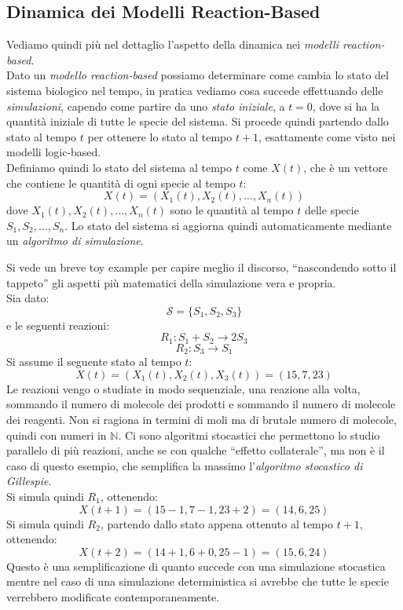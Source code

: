 \documentclass[a4paper,12pt, oneside]{book}
\begin{document}
\subsection{Dinamica dei Modelli Reaction-Based}
Vediamo quindi più nel dettaglio l'aspetto della dinamica nei \textit{modelli
  reaction-based}.\\
Dato un \textit{modello reaction-based} possiamo determinare come cambia lo
stato del sistema biologico nel tempo, in pratica vediamo cosa succede
effettuando delle \textit{simulazioni}, capendo come partire da uno
\textit{stato iniziale}, a $t=0$, dove si ha la quantità iniziale di tutte le
specie del sistema. Si procede quindi partendo dallo stato al tempo $t$ per
ottenere lo stato al tempo $t+1$, esattamente come visto nei \textmd{modelli
  logic-based}. \\
Definiamo quindi lo stato del sistema al tempo $t$ come $X(t)$, che è un vettore
che contiene le quantità di ogni specie al tempo $t$:
\[X(t)=\left( X_1(t), X_2(t),\ldots, X_n(t)\right)\]
dove $X_1(t), X_2(t),\ldots, X_n(t)$ sono le quantità al tempo $t$ delle specie
$S_1, S_2,\ldots, S_n$. Lo stato del sistema si aggiorna quindi automaticamente
mediante un \textit{algoritmo di simulazione}.
\begin{esempio}
  Si vede un breve toy example per capire meglio il discorso, ``nascondendo
  sotto il tappeto'' gli aspetti più matematici della simulazione vera e
  propria.\\ 
  Sia dato:
  \[\mathcal{S}=\{S_1,S_2,S_3\}\]
  e le seguenti reazioni:
  \[R_1:S_1+S_2\to 2S_3\]
  \[R_2: S_3\to S_1\]
  Si assume il seguente stato al tempo $t$:
  \[X(t)=\left( X_1(t), X_2(t), X_3(t)\right) = (15,7,23)\]
  Le reazioni vengo o studiate in modo sequenziale, una reazione alla volta,
  sommando il numero di molecole dei prodotti e sommando il numero di molecole
  dei reagenti. Non si ragiona in termini di moli ma di brutale numero di
  molecole, quindi con numeri in $\mathbb{N}$. Ci sono algoritmi stocastici che
  permettono 
  lo studio parallelo di più reazioni, anche se con qualche ``effetto
  collaterale'',  ma non è il caso di questo esempio, che
  semplifica la massimo l'\textit{algoritmo stocastico di Gillespie}.\\ 
  Si simula quindi $R_1$, ottenendo:
  \[X(t+1)=(15-1, 7-1, 23+2) = (14, 6, 25)\]
  Si simula quindi $R_2$, partendo dallo stato appena ottenuto al tempo $t+1$,
  ottenendo: 
  \[X(t+2)=(14+1, 6+0, 25-1) = (15, 6, 24)\]
  Questo è una semplificazione di quanto succede con una simulazione stocastica
  mentre nel caso di una simulazione deterministica si avrebbe che tutte le
  specie verrebbero modificate contemporaneamente.
\end{esempio}
\end{document}
